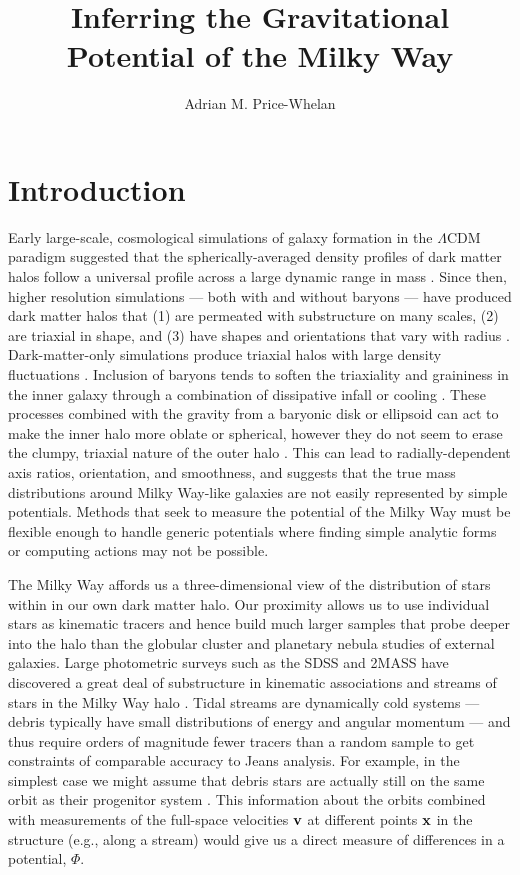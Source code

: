 \documentclass[letterpaper,12pt,preprint]{aastex}
\begin{document}
\title{Inferring the Gravitational Potential of the Milky Way}
\author{Adrian M. Price-Whelan}

\section{Introduction}

Early large-scale, cosmological simulations of galaxy formation in the $\Lambda$CDM paradigm suggested that the spherically-averaged density profiles of dark matter halos follow a universal profile across a large dynamic range in mass \citep{navarro96}. Since then, higher resolution simulations --- both with and without baryons --- have produced dark matter halos that (1) are permeated with substructure on many scales, (2) are triaxial in shape, and (3) have shapes and orientations that vary with radius \citep{dubinski91, jing02, kuhlen07, veraciro11}. Dark-matter-only simulations produce triaxial halos \citep{jing02} with large density fluctuations \citep{zemp09}. Inclusion of baryons tends to soften the triaxiality and graininess in the inner galaxy through a combination of dissipative infall \citep{dubinski94} or cooling \citep{bryan13}. These processes combined with the gravity from a baryonic disk or ellipsoid can act to make the inner halo more oblate or spherical, however they do not seem to erase the clumpy, triaxial nature of the outer halo \citep[e.g.,][]{pontzen12}. This can lead to radially-dependent axis ratios, orientation, and smoothness, and suggests that the true mass distributions around Milky Way-like galaxies are not easily represented by simple potentials. Methods that seek to measure the potential of the Milky Way must be flexible enough to handle generic potentials where finding simple analytic forms or computing actions may not be possible.

The Milky Way affords us a three-dimensional view of the distribution of stars within in our own dark matter halo. Our proximity allows us to use individual stars as kinematic tracers and hence build much larger samples that probe deeper into the halo than the globular cluster and planetary nebula studies of external galaxies. Large photometric surveys such as the SDSS and 2MASS \citep{skrutskie06} have discovered a great deal of substructure in kinematic associations and streams of stars in the Milky Way halo \citep[e.g.,][]{belokurov06, rochapinto04}. Tidal streams are dynamically cold systems --- debris typically have small distributions of energy and angular momentum --- and thus require orders of magnitude fewer tracers than a random sample to get constraints of comparable accuracy to Jeans analysis. For example, in the simplest case we might assume that debris stars are actually still on the same orbit as their progenitor system \citep[a \emph{wrong} assumption, see e.g.,][]{eyre11}. This information about the orbits combined with measurements of the full-space velocities ${\bf v}$ at different points ${\bf x}$ in the structure (e.g., along a stream) would give us a direct measure of differences in a potential, $\Phi$.
\end{document}
